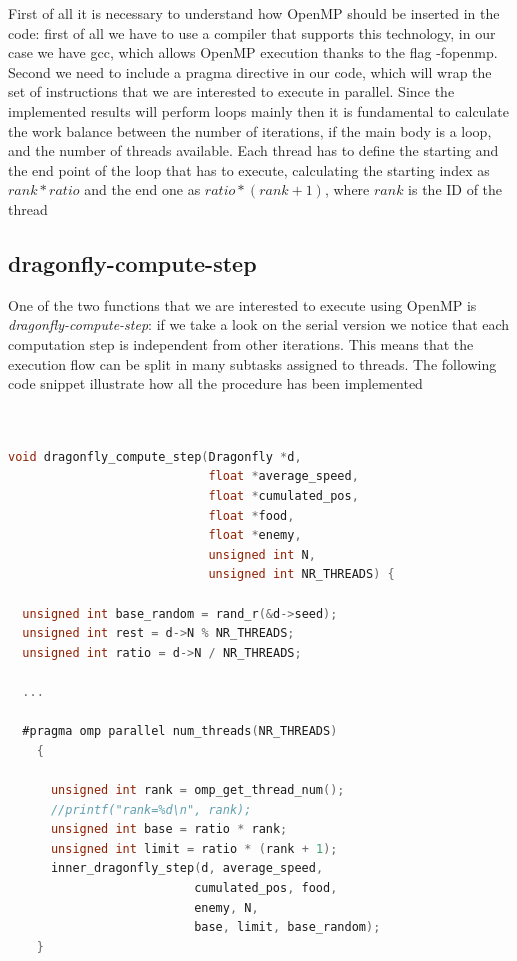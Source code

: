 \documentclass[10pt]{article}
\begin{document}
\begin{multicols}{2}
\begin{itemize}
First of all it is necessary to understand how OpenMP should be inserted in the code: first of all we have to use 
a compiler that supports this technology, in our case we have gcc, which allows OpenMP execution thanks to the flag -fopenmp.
Second we need to include a pragma directive in our code, which will wrap the set of instructions that we are interested to execute
in parallel. Since the implemented results will perform loops mainly then it is fundamental to calculate the work balance between the number of iterations, if the main
body is a loop,
and the number of threads available. Each thread has to define the starting and the end point of the loop that has to execute,
calculating the starting index as $rank*ratio$ and the end one as $ratio*(rank+1)$, where $rank$ is the ID of the thread

\subsection*{dragonfly-compute-step}

One of the two functions that we are interested to execute using OpenMP is \textit{dragonfly-compute-step}:
if we take a look on the serial version we notice that each computation step is independent
from other iterations. This means that the execution flow can be split in many subtasks assigned
to threads. The following code snippet illustrate how all the procedure has been implemented
\begin{lstlisting}[language=C,caption={parallelized dragonfly-compute-step}]
  

void dragonfly_compute_step(Dragonfly *d, 
                            float *average_speed,
                            float *cumulated_pos, 
                            float *food, 
                            float *enemy, 
                            unsigned int N, 
                            unsigned int NR_THREADS) {

  unsigned int base_random = rand_r(&d->seed);
  unsigned int rest = d->N % NR_THREADS;
  unsigned int ratio = d->N / NR_THREADS;

  ...

  #pragma omp parallel num_threads(NR_THREADS)
    {
      
      unsigned int rank = omp_get_thread_num();
      //printf("rank=%d\n", rank);
      unsigned int base = ratio * rank;
      unsigned int limit = ratio * (rank + 1);
      inner_dragonfly_step(d, average_speed, 
                          cumulated_pos, food, 
                          enemy, N,
                          base, limit, base_random);
    }
  

\end{lstlisting}
\end{itemize}
\end{multicols}
\end{document}
